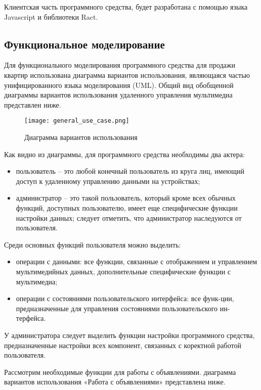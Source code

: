 Клиентская часть программного средства, будет разработана с помощью языка Javascript и библиотеки Ract.

\subsection{Функциональное моделирование}

Для функционального моделирования программного средства для продажи квартир использована диаграмма вариантов использования, являющаяся частью унифицированного языка моделирования (UML).
Общий вид обобщенной диаграммы вариантов использования удаленного управления мультимедиа представлен ниже.

\begin{figure}[!htb]
	\centering
	\texttt{[image: general\_use\_case.png]}
	\caption{ Диаграмма вариантов использования}
	\label{fig:arch_and_mod::lexer_flow}
	\clearpage
\end{figure}

Как видно из диаграммы, для программного средства необходимы два актера:

\begin{itemize}
	\item пользователь – это любой конечный пользователь из круга лиц, имеющий доступ к удаленному управлению данными на устройствах;
	\item администратор – это такой пользователь, который кроме всех обычных функций, доступных пользователю, имеет еще специфические функции настройки данных; следует отметить, что администратор наследуются от пользователя.
\end{itemize}

Среди основных функций пользователя можно выделить:

\begin{itemize}
	\item операции с данными: все функции, связанные с отображением и управлением мультимедийных данных, дополнительные специфические функции с мультимедиа;
	\item операции с состояниями пользовательского интерфейса: все функ-ции, предназначенные для управления состояниями пользовательского ин-терфейса.
\end{itemize}

У администратора следует выделить функции настройки программного средства, предназначенные настройки всех компонент, связанных с коректной работой пользователя.

Рассмотрим необходимые функции для работы с объявлениями. диаграмма вариантов использования «Работа с объявлениями» представлена ниже.

